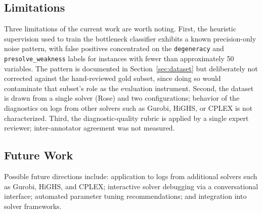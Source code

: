 \documentclass[11pt]{article}
\begin{document}
\subsection{Limitations}

Three limitations of the current work are worth noting.
First, the heuristic supervision used to train the bottleneck classifier exhibits a known precision-only noise pattern, with false positives concentrated on the \texttt{degeneracy} and \texttt{presolve\_weakness} labels for instances with fewer than approximately 50 variables.
The pattern is documented in Section~\ref{sec:dataset} but deliberately not corrected against the hand-reviewed gold subset, since doing so would contaminate that subset's role as the evaluation instrument.
Second, the dataset is drawn from a single solver (Rose) and two configurations; behavior of the diagnostics on logs from other solvers such as Gurobi, HiGHS, or CPLEX is not characterized.
Third, the diagnostic-quality rubric is applied by a single expert reviewer; inter-annotator agreement was not measured.

\subsection{Future Work}

Possible future directions include: application to logs from additional solvers such as Gurobi, HiGHS, and CPLEX; interactive solver debugging via a conversational interface; automated parameter tuning recommendations; and
integration into solver frameworks.
\end{document}

